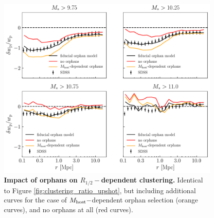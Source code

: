 \documentclass[usenatbib,usegraphicx,letterpaper]{mn2e}
\newcommand{\rhalf}{R_{1/2}}
\begin{document}
\begin{figure}
\centering
\includegraphics[width=12cm]{FIGS/clustering_ratios_orphan_impact.pdf}
\caption{
{\bf Impact of orphans on $\rhalf-$dependent clustering.}  
Identical to Figure \ref{fig:clustering_ratio_upshot}, but including additional curves for the case of $M_{\rm host}-$dependent orphan selection (orange curves), and no orphans at all (red curves). 
}
\label{fig:orphan_size_clustering}
\end{figure}
\end{document}

